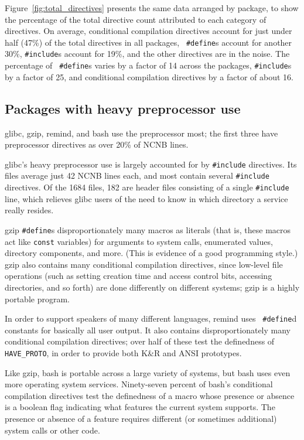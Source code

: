 \documentclass[11pt]{article}
\begin{document}
Figure~\ref{fig:total_directives} presents the same data arranged by
package, to show the percentage of the total directive count attributed to
each category of directives.
On average, conditional compilation directives account
for just under half (47\%) of the total directives in all packages, {\tt
\#define}s account for another 30\%, {\tt \#include}s account for 19\%,
and the other directives are in the noise.  The percentage of {\tt
\#define}s varies by a factor of 14 across the packages, {\tt \#include}s
by a factor of 25, and conditional compilation directives by a factor of
about 16.


\subsection{Packages with heavy preprocessor use}

glibc, gzip, remind, and bash use the preprocessor most; the first three
have preprocessor directives as over 20\% of NCNB lines.

glibc's heavy preprocessor use is largely accounted for by {\tt \#include}
directives.  Its files average just 42 NCNB lines each, and most contain
several {\tt \#include} directives.  Of the 1684 files, 182 are header files
consisting of a single {\tt \#include} line, which relieves glibc users of
the need to know in which directory a service really resides.

gzip {\tt \#define}s disproportionately many macros as literals (that is,
these macros act like {\tt const} variables) for arguments to system calls,
enumerated values, directory components, and more.  (This is evidence of a
good programming style.)  gzip also contains many conditional compilation
directives, since low-level file operations (such as setting creation time
and access control bits, accessing directories, and so forth) are done
differently on different systems; gzip is a highly portable program.

In order to support speakers of many different languages, remind uses {\tt
\#define}d constants for basically all user output.  It also contains
disproportionately many conditional compilation directives; over half of
these test the definedness of \verb|HAVE_PROTO|, in order to provide both
K\&R and ANSI prototypes.  

Like gzip, bash is portable across a large variety of systems, but bash
uses even more operating system services.  Ninety-seven percent of bash's
conditional compilation directives test the definedness of a macro whose
presence or absence is a boolean flag indicating what features the current
system supports.  The presence or absence of a feature requires different
(or sometimes additional) system calls or other code.
\end{document}
